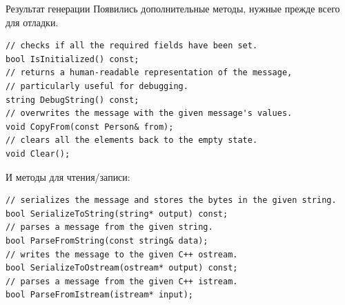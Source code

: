 \documentclass{beamer}
\begin{document}
\begin{frame}[fragile]{Результат генерации}
    Появились дополнительные методы, нужные прежде всего для отладки.
    \small
\begin{lstlisting}
// checks if all the required fields have been set.
bool IsInitialized() const;
// returns a human-readable representation of the message, 
// particularly useful for debugging.
string DebugString() const;
// overwrites the message with the given message's values.
void CopyFrom(const Person& from);
// clears all the elements back to the empty state.
void Clear();
\end{lstlisting}
    И методы для чтения/записи:
\begin{lstlisting}
// serializes the message and stores the bytes in the given string.
bool SerializeToString(string* output) const;
// parses a message from the given string.
bool ParseFromString(const string& data);
// writes the message to the given C++ ostream.
bool SerializeToOstream(ostream* output) const;
// parses a message from the given C++ istream.
bool ParseFromIstream(istream* input);
\end{lstlisting}
\end{frame}
\end{document}
